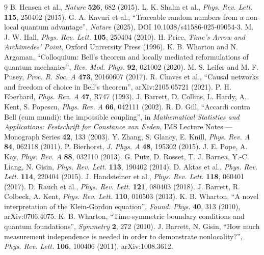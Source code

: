 \documentclass[
  11pt,
]{article}
\begin{document}
\begin{thebibliography}{9}
 B. Hensen et al., \textit{Nature} \textbf{526}, 682 (2015).
 L. K. Shalm et al., \textit{Phys. Rev. Lett.} \textbf{115}, 250402 (2015).
 G. A. Kavuri et al., ``Traceable random numbers from a non-local quantum advantage'', \textit{Nature} (2025), DOI 10.1038/s41586-025-09054-3.
 M. J. W. Hall, \textit{Phys. Rev. Lett.} \textbf{105}, 250404 (2010).
 H. Price, \textit{Time's Arrow and Archimedes' Point}, Oxford University Press (1996).
 K. B. Wharton and N. Argaman, ``Colloquium: Bell's theorem and locally mediated reformulations of quantum mechanics'', \textit{Rev. Mod. Phys.} \textbf{92}, 021002 (2020).
 M. S. Leifer and M. F. Pusey, \textit{Proc. R. Soc. A} \textbf{473}, 20160607 (2017).
 R. Chaves et al., ``Causal networks and freedom of choice in Bell's theorem'', arXiv:2105.05721 (2021).
 P. H. Eberhard, \textit{Phys. Rev. A} \textbf{47}, R747 (1993).
 J. Barrett, D. Collins, L. Hardy, A. Kent, S. Popescu, \textit{Phys. Rev. A} \textbf{66}, 042111 (2002).
 R. D. Gill, ``Accardi contra Bell (cum mundi): the impossible coupling'', in \textit{Mathematical Statistics and Applications: Festschrift for Constance van Eeden}, IMS Lecture Notes --- Monograph Series \textbf{42}, 133 (2003).
 Y. Zhang, S. Glancy, E. Knill, \textit{Phys. Rev. A} \textbf{84}, 062118 (2011).
 P. Bierhorst, \textit{J. Phys. A} \textbf{48}, 195302 (2015).
 J. E. Pope, A. Kay, \textit{Phys. Rev. A} \textbf{88}, 032110 (2013).
 G. Pütz, D. Rosset, T. J. Barnea, Y.-C. Liang, N. Gisin, \textit{Phys. Rev. Lett.} \textbf{113}, 190402 (2014).
 D. Aktas et al., \textit{Phys. Rev. Lett.} \textbf{114}, 220404 (2015).
 J. Handsteiner et al., \textit{Phys. Rev. Lett.} \textbf{118}, 060401 (2017).
 D. Rauch et al., \textit{Phys. Rev. Lett.} \textbf{121}, 080403 (2018).
 J. Barrett, R. Colbeck, A. Kent, \textit{Phys. Rev. Lett.} \textbf{110}, 010503 (2013).
 K. B. Wharton, ``A novel interpretation of the Klein-Gordon equation'', \textit{Found. Phys.} \textbf{40}, 313 (2010), arXiv:0706.4075.
 K. B. Wharton, ``Time-symmetric boundary conditions and quantum foundations'', \textit{Symmetry} \textbf{2}, 272 (2010).
 J. Barrett, N. Gisin, ``How much measurement independence is needed in order to demonstrate nonlocality?'', \textit{Phys. Rev. Lett.} \textbf{106}, 100406 (2011), arXiv:1008.3612.

\end{thebibliography}
\end{document}
